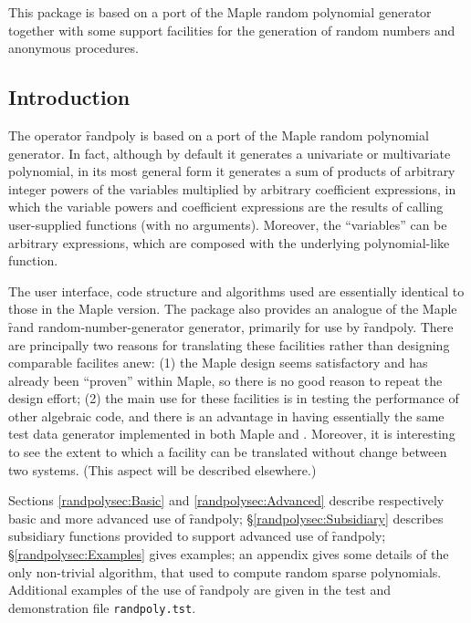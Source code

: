 

  This package is based on a port of the Maple random polynomial
  generator together with some support facilities for the generation
  of random numbers and anonymous procedures.


\subsection{Introduction}

\hypertarget{operator:RANDPOLY}{}
The operator \f{randpoly}
is based on a port of the Maple random
polynomial generator.  In fact, although by default it generates a
univariate or multivariate polynomial, in its most general form it
generates a sum of products of arbitrary integer powers of the
variables multiplied by arbitrary coefficient expressions, in which
the variable powers and coefficient expressions are the results of
calling user-supplied functions (with no arguments).  Moreover, the
``variables'' can be arbitrary expressions, which are composed with
the underlying polynomial-like function.

The user interface, code structure and algorithms used are essentially
identical to those in the Maple version.  The package also provides an
analogue of the Maple \f{rand} random-number-generator generator,
primarily for use by \f{randpoly}.  There are principally two
reasons for translating these facilities rather than designing
comparable facilites anew: (1) the Maple design seems satisfactory and
has already been ``proven'' within Maple, so there is no good reason
to repeat the design effort; (2) the main use for these facilities is
in testing the performance of other algebraic code, and there is an
advantage in having essentially the same test data generator
implemented in both Maple and \REDUCE\@.  Moreover, it is interesting
to see the extent to which a facility can be translated without change
between two systems.  (This aspect will be described elsewhere.)

Sections \ref{randpolysec:Basic} and \ref{randpolysec:Advanced} describe respectively
basic and more advanced use of \f{randpoly}; \S\ref{randpolysec:Subsidiary}
describes subsidiary functions provided to support advanced use of
\f{randpoly}; \S\ref{randpolysec:Examples} gives examples; an appendix gives
some details of the only non-trivial algorithm, that used to compute
random sparse polynomials.  Additional examples of the use of
\f{randpoly} are given in the test and demonstration file \texttt{randpoly.tst}.



